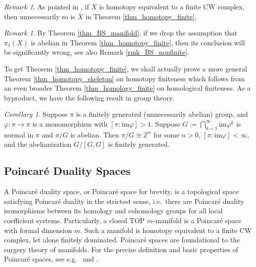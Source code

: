 \documentclass[12pt]{amsart}
\theoremstyle{plain}
\theoremstyle{definition}
\theoremstyle{question}
\theoremstyle{remark}
\newtheorem{remark}[theorem]{Remark}
\theoremstyle{assumption}
\numberwithin{equation}{section}
\theoremstyle{bigthm}
\newtheorem{bigcor}[bigthm]{Corollary}
\begin{document}
\begin{remark}
As pointed in \cite[Remark~1.4]{Qin_Su_Wang}, if $X$ is homotopy equivalent to a finite CW complex, then unnecessarily so is $\overline{X}$ in Theorem \ref{thm_homotopy_finite}.
\end{remark}

\begin{remark}
By Theorem \ref{thm_BS_manifold}, if we drop the assumption that $\pi_{1} (X)$ is abelian in Theorem \ref{thm_homotopy_finite}, then its conclusion will be significantly wrong, see also Remark \ref{rmk_BS_nonfinite}.
\end{remark}

To get Theorem \ref{thm_homotopy_finite}, we shall actually prove a more general Theorem \ref{thm_homotopy_skeleton} on homotopy finiteness which follows from an even broader Theorem \ref{thm_homology_finite} on homological finiteness. As a byproduct, we have the following result in group theory.
\begin{bigcor}\label{cor_group}
Suppose $\pi$ is a finitely generated (unnecessarily abelian) group, and $\varphi \colon  \pi \rightarrow \pi$ is a monomorphism with $[\pi : \mathrm{im} \varphi] >1$. Suppose $G:= \bigcap_{k=1}^{\infty} \mathrm{im} \varphi^{k}$ is normal in $\pi$ and $\pi / G$ is abelian. Then $\pi / G\cong \mathbb{Z}^{n}$ for some $n>0$, $[\pi : \mathrm{im} \varphi] < \infty$, and the abelianization $G / [G,G]$ is finitely generated.
\end{bigcor}

\subsection{Poincar\'{e} Duality Spaces}
A Poincar\'{e} duality space, or Poincar\'e space for brevity, is a topological space satisfying Poincar\'{e} duality in the strictest sense, i.e.~there are Poincar\' e duality isomorphisms between its homology and cohomology groups for all local coefficient systems. Particularly, a closed TOP $m$-manifold is a Poincar\'e space with formal dimension $m$. Such a manifold is homotopy equivalent to a finite CW complex, let alone finitely dominated. Poincar\'e spaces are foundational to the surgery theory of manifolds. For the precise definition and basic properties of Poincar\'e spaces, see e.g.~\cite{Wall67} and \cite{Klein_Qin_Su}.
\end{document}
